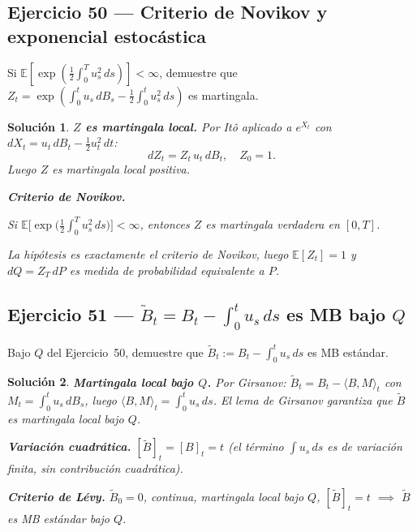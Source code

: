 \documentclass[12pt,letterpaper]{article}
\theoremstyle{ejercicio}
\theoremstyle{solucion}
\newtheorem*{solucion}{Solución}
\newcommand{\E}{\mathbb{E}}
\begin{document}
\subsection*{Ejercicio 50 — Criterio de Novikov y exponencial estocástica}

\begin{recuadro}
Si $\E[\exp(\frac{1}{2}\int_0^T u_s^2\,ds)]<\infty$, demuestre que
$Z_t=\exp(\int_0^t u_s\,dB_s-\frac{1}{2}\int_0^t u_s^2\,ds)$ es martingala.
\end{recuadro}

\begin{solucion}
\textbf{$Z$ es martingala local.} Por Itô aplicado a $e^{X_t}$ con $dX_t=u_t\,dB_t-\frac{1}{2}u_t^2\,dt$:
\[
  dZ_t=Z_t\,u_t\,dB_t,\quad Z_0=1.
\]
Luego $Z$ es martingala local positiva.

\textbf{Criterio de Novikov.}
\begin{recuadro}
Si $\E\!\bigl[\exp\!\bigl(\frac{1}{2}\int_0^T u_s^2\,ds\bigr)\bigr]<\infty$,
entonces $Z$ es martingala verdadera en $[0,T]$.
\end{recuadro}
La hipótesis es exactamente el criterio de Novikov, luego $\E[Z_t]=1$ y $dQ=Z_T\,dP$ es
medida de probabilidad equivalente a $P$.
\end{solucion}

\subsection*{Ejercicio 51 — $\tilde B_t=B_t-\int_0^t u_s\,ds$ es MB bajo $Q$}

\begin{recuadro}
Bajo $Q$ del Ejercicio~50, demuestre que $\tilde B_t:=B_t-\int_0^t u_s\,ds$ es MB estándar.
\end{recuadro}

\begin{solucion}
\textbf{Martingala local bajo $Q$.} Por Girsanov: $\tilde B_t=B_t-\langle B,M\rangle_t$
con $M_t=\int_0^t u_s\,dB_s$, luego $\langle B,M\rangle_t=\int_0^t u_s\,ds$.
El lema de Girsanov garantiza que $\tilde B$ es martingala local bajo $Q$.

\textbf{Variación cuadrática.} $[\tilde B]_t=[B]_t=t$ (el término $\int u_s\,ds$ es de
variación finita, sin contribución cuadrática).

\textbf{Criterio de Lévy.} $\tilde B_0=0$, continua, martingala local bajo $Q$,
$[\tilde B]_t=t$ $\implies$ $\tilde B$ es MB estándar bajo $Q$.
\end{solucion}
\end{document}

